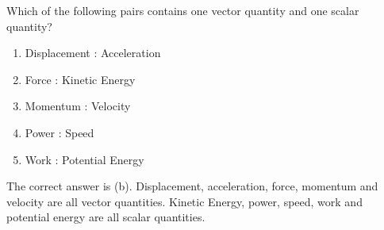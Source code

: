 
\begin{problem} 
{Which of the following pairs contains one vector quantity and one scalar quantity?
\begin{enumerate}
	\item Displacement \quad : \quad Acceleration
	\item Force \quad : \quad Kinetic Energy \answer
	\item Momentum \quad : \quad Velocity
	\item Power \quad : \quad Speed
	\item Work \quad : \quad Potential Energy
\end{enumerate}}
{}
{The correct answer is (b). Displacement, acceleration, force, momentum and velocity are all vector quantities. Kinetic Energy, power, speed, work and potential energy are all scalar quantities.}
\end{problem}